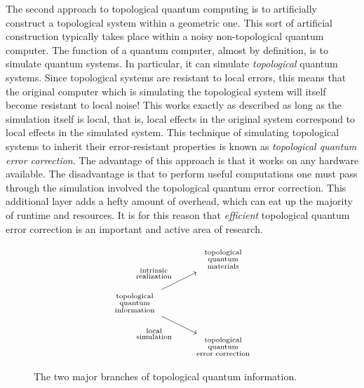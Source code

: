The second approach to topological quantum computing is to artificially construct a topological system within a geometric one. This sort of artificial construction typically takes place within a noisy non-topological quantum computer. The function of a quantum computer, almost by definition, is to simulate quantum systems. In particular, it can simulate \textit{topological} quantum systems. Since topological systems are resistant to local errors, this means that the original computer which is simulating the topological system will itself become resistant to local noise! This works exactly as described as long as the simulation itself is local, that is, local effects in the original system correspond to local effects in the simulated system. This technique of simulating topological systems to inherit their error-resistant properties is known as \textit{topological quantum error correction}. The advantage of this approach is that it works on any hardware available. The disadvantage is that to perform useful computations one must pass through the simulation involved the topological quantum error correction. This additional layer adds a hefty amount of overhead, which can eat up the majority of runtime and resources. It is for this reason that \textit{efficient} topological quantum error correction is an important and active area of research.

\begin{figure}
\[\begin{tikzcd}
	& \begin{array}{c} \substack{\text{topological}\\ \text{quantum}\\\text{materials}} \end{array} \\
	\begin{array}{c} \substack{\text{topological} \\ \text{quantum} \\ \text{information}} \end{array} \\
	& \begin{array}{c} \substack{\text{topological}\\\text{quantum}\\ \text{error correction}} \end{array}
	\arrow["\begin{array}{c} \substack{\text{intrinsic}\\\text{realization}} \end{array}", from=2-1, to=1-2]
	\arrow["\begin{array}{c} \substack{\text{local}\\\text{simulation}} \end{array}"', from=2-1, to=3-2]
\end{tikzcd}\]
\caption{The two major branches of topological quantum information.}
\end{figure}

